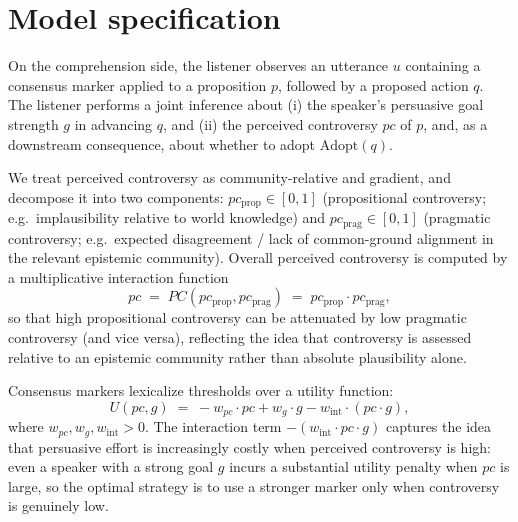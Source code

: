 \documentclass[12pt]{article}
\begin{document}
\section{Model specification}

On the comprehension side, the listener observes an utterance $u$ containing a consensus marker applied to a proposition $p$, followed by a proposed action $q$. The listener performs a joint inference about (i) the speaker's persuasive goal strength $g$ in advancing $q$, and (ii) the perceived controversy $pc$ of $p$, and, as a downstream consequence, about whether to adopt $\mathrm{Adopt}(q)$.

We treat perceived controversy as community-relative and gradient, and decompose it into two components:
$pc_{\text{prop}} \in [0,1]$ (propositional controversy; e.g.\ implausibility relative to world knowledge) and
$pc_{\text{prag}} \in [0,1]$ (pragmatic controversy; e.g.\ expected disagreement / lack of common-ground alignment in the relevant epistemic community).
Overall perceived controversy is computed by a multiplicative interaction function
\begin{equation}
pc \;=\; PC(pc_{\text{prop}}, pc_{\text{prag}})
\;=\;
pc_{\text{prop}} \cdot pc_{\text{prag}},
\end{equation}
so that high propositional controversy can be attenuated by low pragmatic controversy (and vice versa), reflecting the idea that controversy is assessed relative to an epistemic community rather than absolute plausibility alone.

Consensus markers lexicalize thresholds over a utility function:
\begin{equation}
U(pc, g)
\;=\;
- w_{pc} \cdot pc
+
w_g \cdot g
-
w_{\mathrm{int}} \cdot (pc \cdot g),
\label{eq:utility}
\end{equation}
where $w_{pc}, w_g, w_{\mathrm{int}} > 0$. The interaction term $-(w_{\mathrm{int}} \cdot pc \cdot g)$ captures the idea that persuasive effort is increasingly costly when perceived controversy is high: even a speaker with a strong goal $g$ incurs a substantial utility penalty when $pc$ is large, so the optimal strategy is to use a stronger marker only when controversy is genuinely low.
\end{document}
